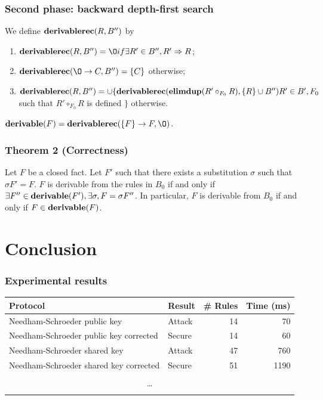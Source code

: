 \documentclass[10pt]{beamer}
\begin{document}
\begin{frame}
  \frametitle{Second phase: backward depth-first search}

  We define $\textbf{derivablerec}(R,B'')$ by
  \begin{enumerate}
    \item $\fun{derivablerec}(R,B'') = Ø if \exists R' \in B'', R' \Rightarrow R$;
    \item $\fun{derivablerec}(Ø \rightarrow C, B'') = \{C\}$ otherwise;
    \item $\textbf{derivablerec}(R, B'') = \cup \{\textbf{derivablerec}(\textbf{elimdup}(R' \circ_{F_0} R), \{R\} \cup B'') R' \in B', F_0$ such that $R' \circ_{F_0} R$ is defined $\}$ otherwise.
  \end{enumerate}
  \vspace{1em}
  $\fun{derivable}(F) = \fun{derivablerec}(\{F\} \rightarrow F, Ø)$.
\end{frame}

\begin{frame}
  \frametitle{Theorem 2 (Correctness)}
  \centering

  \parbox{.7\textwidth}{
    Let $F$ be a closed fact.
    Let $F'$ such that there exists a substitution $\sigma$ such that $\sigma F' = F$.
    $F$ is derivable from the rules in $B_0$ if and only if $\exists F'' \in \textbf{derivable}(F'), \exists \sigma, F = \sigma F''$.
    In particular, $F$ is derivable from $B_0$ if and only if $F \in \textbf{derivable}(F)$.
  }
\end{frame}

\section{Conclusion}

\begin{frame}
  \frametitle{Experimental results}
  \centering

  {\footnotesize
  \begin{tabular}{|l|l|r|r|}
    \hline
    Protocol & Result & \# Rules & Time (ms) \\ \hline
    Needham-Schroeder public key & Attack & 14 & 70 \\
    Needham-Schroeder public key corrected & Secure & 14 & 60 \\
    Needham-Schroeder shared key & Attack & 47 & 760 \\
    Needham-Schroeder shared key corrected & Secure & 51 & 1190 \\
    \multicolumn{4}{|c|}{} \\
    \multicolumn{4}{|c|}{\dots} \\
    \multicolumn{4}{|c|}{} \\ \hline
  \end{tabular}}
\end{frame}
\end{document}
